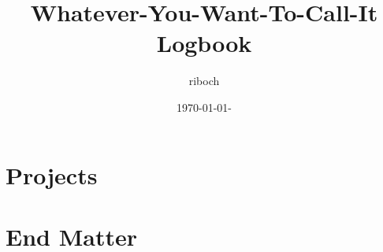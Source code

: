 \documentclass[12pt]{report}
\title{Whatever-You-Want-To-Call-It Logbook}
\author{riboch}
\date{\today-\currenttime}
\begin{document}
\maketitle
\tableofcontents


%
%
%


\part{Projects}


\part{End Matter}
\begin{appendices}



\end{appendices}


\clearpage
{}
\nocite{*}%
\printbibliography


%

\clearpage
\printindex
\end{document}
